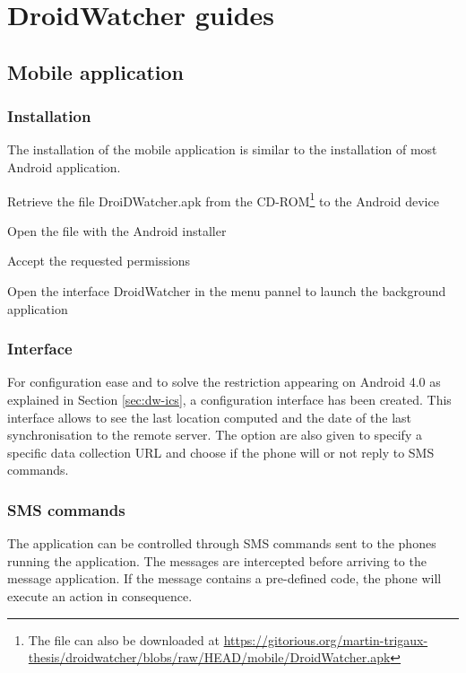 \chapter{DroidWatcher guides}

\label{dw-guide}

\section{Mobile application}
\label{sec:dw-user-manual}

\subsection{Installation}

The installation of the mobile application is similar to the installation of most Android application.

\begin{enumeratealt}
\item Retrieve the file DroiDWatcher.apk from the CD-ROM\footnote{The file can also be downloaded at \url{https://gitorious.org/martin-trigaux-thesis/droidwatcher/blobs/raw/HEAD/mobile/DroidWatcher.apk}} to the Android device
\item Open the file with the Android installer
\item Accept the requested permissions
\item Open the interface DroidWatcher in the menu pannel to launch the background application
\end{enumeratealt}

\subsection{Interface}
\label{sec:dw-gui}

For configuration ease and to solve the restriction appearing on Android 4.0 as explained in Section \ref{sec:dw-ics}, a configuration interface has been created.
This interface allows to see the last location computed and the date of the last synchronisation to the remote server.
The option are also given to specify a specific data collection URL and choose if the phone will or not reply to SMS commands.

\subsection{SMS commands}
\label{sec:dw-smscom}

The application can be controlled through SMS commands sent to the phones running the application.
The messages are intercepted before arriving to the message application.
If the message contains a pre-defined code, the phone will execute an action in consequence.

